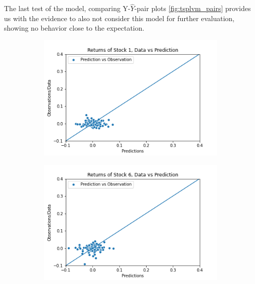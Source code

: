 The last test of the model, comparing Y-$\hat{Y}$-pair plots \ref{fig:tsplvm_pairs} provides us with the evidence to also not consider this model for further evaluation, showing no behavior close to the expectation. 
\begin{figure}%
	\centering
	\begin{subfigure}[l]{0.3\textwidth}
		\includegraphics[width=\textwidth]{img/07_4/timet_elbo/Q1_kernel1_stock1_scatter.png}
	\end{subfigure}
	\begin{subfigure}[c]{0.3\textwidth}
		\includegraphics[width=\textwidth]{img/07_4/timet_elbo/Q1_kernel1_stock6_scatter.png}
	\end{subfigure}
	\begin{subfigure}[r]{0.3\textwidth}

\end{subfigure}
\end{figure}

